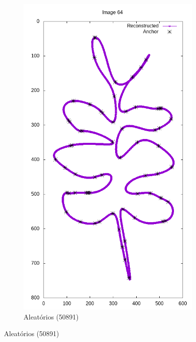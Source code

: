 \begin{frame}
\begin{figure}[ht!]
\begin{subfigure}[t]{0.24\textwidth}
			\includegraphics[width=\textwidth]{img/rec/64rng(50891).png}
			\caption{Aleatórios (50891)}
		\end{subfigure}
		\label{fig:rec6}
	\end{figure}
\end{frame}


